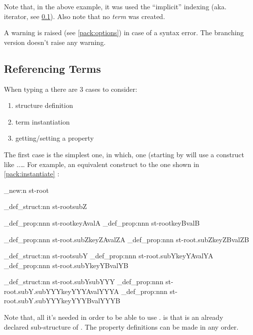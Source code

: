 \documentclass[10pt]{article}
\begin{document}
Note that, in the above example, it was used the ``implicit'' indexing (aka. iterator, see \ref{pack:ref}). Also note that no \textsl{term}   was created.
\begin{tsremark}
A warning is raised (see \ref{pack:options}) in case of a  syntax error. The branching version doesn't raise any warning.
\end{tsremark}

\subsection{Referencing Terms}\label{pack:ref}

When typing a  there are 3 cases to consider:
\begin{enumerate}[miditemsep]
  \item structure definition
  \item term instantiation
  \item getting/setting a property 
\end{enumerate}

The first case is the simplest one, in which, one (starting by  will use a construct like ..\ldots 
For example, an equivalent construct to the one shown in \ref{pack:instantiate} :

\begin{codestore}[store-env=demo3]
\starray_new:n {st-root}

\starray_def_struct:nn {st-root}{subZ}

\starray_def_prop:nnn {st-root}{keyA}{valA}
\starray_def_prop:nnn {st-root}{keyB}{valB}

\starray_def_prop:nnn {st-root.subZ}{keyZA}{valZA}
\starray_def_prop:nnn {st-root.subZ}{keyZB}{valZB}

\starray_def_struct:nn {st-root}{subY}
\starray_def_prop:nnn {st-root.subY}{keyYA}{valYA}
\starray_def_prop:nnn {st-root.subY}{keyYB}{valYB}

\starray_def_struct:nn {st-root.subY}{subYYY}
\starray_def_prop:nnn {st-root.subY.subYYY}{keyYYYA}{valYYYA}
\starray_def_prop:nnn {st-root.subY.subYYY}{keyYYYB}{valYYYB}
  
\end{codestore}


Note that, all it's needed in order to be able to use . is that  is an already declared sub-structure of . The property definitions can be made in any order.
\end{document}
